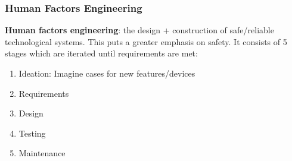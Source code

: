 \documentclass{article}
\begin{document}
\subsubsection*{Human Factors Engineering}
\textbf{Human factors engineering}: the design + construction of safe/reliable technological systems. This puts a greater emphasis on safety. It consists of 5 stages which are iterated until requirements are met: 
\begin{enumerate}
    \item Ideation: Imagine cases for new features/devices
    \item Requirements
    \item Design
    \item Testing
    \item Maintenance 
\end{enumerate}
\end{document}
